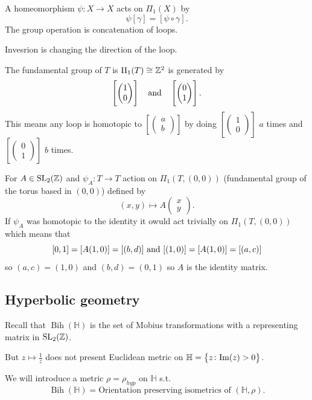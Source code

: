 \documentclass[11pt,a4paper]{article}
\DeclareMathOperator{\Bih}{Bih}
\renewcommand{\H}{\mathbb H}
\begin{document}
A homeomorphism $\psi \colon X \to X$ acts on $\Pi_1(X)$ by
\[
  \psi[\gamma] = [\psi \circ \gamma].
\]
The group operation is concatenation of loops.

Invesrion is changing the direction of the loop.

\begin{exercise}
  The fundamental group of $T$ is $\Pi_1(T) \cong \mathbb{Z}^2$ is generated
  by \[\left[\begin{pmatrix} 1 \\ 0 \end{pmatrix}\right] \quad \text{and} \quad
  \left[\begin{pmatrix} 0 \\ 1 \end{pmatrix}\right].\]
  This means any loop is homotopic to
  $[\begin{pmatrix} a \\ b \end{pmatrix}]$
  by doing $[\begin{pmatrix} 1 \\ 0 \end{pmatrix}]$ $a$ times
  and $[\begin{pmatrix} 0 \\ 1 \end{pmatrix}]$ $b$ times.
\end{exercise}

For $A \in \mathrm{SL}_2(\mathbb{Z})$ and $\psi_A \colon T \to T$ action on
$\Pi_1(T, (0,0))$ (fundamental group of the torus based in $(0,0)$)
defined by
\[
  (x,y) \mapsto A \begin{pmatrix} x \\ y \end{pmatrix}.
\]
If $\psi_A$ was homotopic to the identity it owuld act trivially on
$\Pi_1(T, (0,0))$ which means that
\[
  [0,1] = [A (1,0)] = [(b,d)] \text{ and } [(1,0)] = [A(1,0)] = [(a,c)]
\]
so $(a,c) = (1,0)$ and $(b,d) = (0,1)$ so $A$ is the identity matrix.

\subsection{Hyperbolic geometry}
Recall that $\Bih(\H)$ is the set of Mobius transformations with a representing
matrix in $\mathrm{SL}_2(\mathbb{Z})$.

But $z \mapsto \frac 1z$ does not present Euclidean metric on 
$\H = \set{z \colon \Im(z) > 0}$.

We will introduce a metric $\rho = \rho_{hyp}$ on $\H$ s.t.\
\[
  \Bih(\H) = \text{Orientation preserving isometrics of } (\H,\rho).
\]
\end{document}
